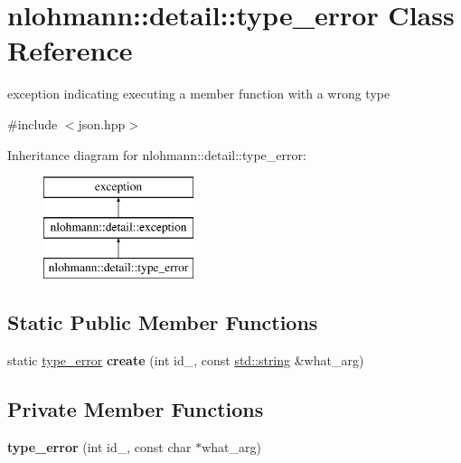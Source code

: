 \hypertarget{classnlohmann_1_1detail_1_1type__error}{}\section{nlohmann\+:\+:detail\+:\+:type\+\_\+error Class Reference}
\label{classnlohmann_1_1detail_1_1type__error}


exception indicating executing a member function with a wrong type  




{\ttfamily \#include $<$json.\+hpp$>$}

Inheritance diagram for nlohmann\+:\+:detail\+:\+:type\+\_\+error\+:\begin{figure}[H]
\begin{center}
\leavevmode
\includegraphics[height=3.000000cm]{classnlohmann_1_1detail_1_1type__error}
\end{center}
\end{figure}
\subsection*{Static Public Member Functions}
\begin{DoxyCompactItemize}
\item 
\mbox{\label{classnlohmann_1_1detail_1_1type__error_aecc083aea4b698c33d042670ba50c10f}} 
static \mbox{\hyperlink{classnlohmann_1_1detail_1_1type__error}{type\+\_\+error}} {\bfseries create} (int id\+\_\+, const \mbox{\hyperlink{namespacenlohmann_1_1detail_a1ed8fc6239da25abcaf681d30ace4985ab45cffe084dd3d20d928bee85e7b0f21}{std\+::string}} \&what\+\_\+arg)
\end{DoxyCompactItemize}
\subsection*{Private Member Functions}
\begin{DoxyCompactItemize}
\item 
\mbox{\label{classnlohmann_1_1detail_1_1type__error_aa01edaa0bf18b853368f0b900e485cd7}} 
{\bfseries type\+\_\+error} (int id\+\_\+, const char $\ast$what\+\_\+arg)
\end{DoxyCompactItemize}

